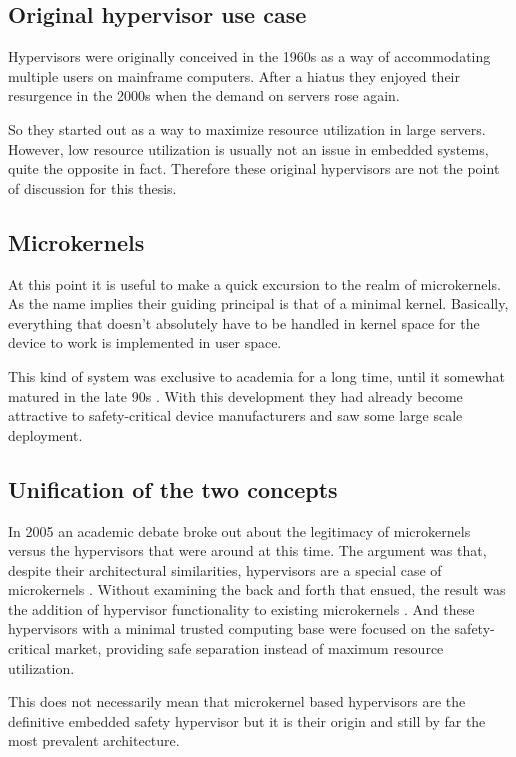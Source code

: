 \subsection{Original hypervisor use case}
Hypervisors were originally conceived in the 1960s as a way of accommodating multiple users on mainframe computers. After a hiatus they enjoyed their resurgence in the 2000s when the demand on servers rose again. 

So they started out as a way to maximize resource utilization in large servers. However, low resource utilization is usually not an issue in embedded systems, quite the opposite in fact. Therefore these original hypervisors are not the point of discussion for this thesis.
\subsection{Microkernels}
At this point it is useful to make a quick excursion to the realm of microkernels. As the name implies their guiding principal is that of a minimal kernel. Basically, everything that doesn't absolutely have to be handled in kernel space for the device to work is implemented in user space.

This kind of system was exclusive to academia for a long time, until it somewhat matured in the late 90s \cite{Liedtke.1995}\cite{Liedtke.1996}. With this development they had already become attractive to safety-critical device manufacturers and saw some large scale deployment.

\subsection{Unification of the two concepts}
In 2005 an academic debate broke out about the legitimacy of microkernels versus the hypervisors that were around at this time. 
The argument was that, despite their architectural similarities, hypervisors are a special case of microkernels  \cite{StevenHand.2005}\cite{Heiser.2006}. Without examining the back and forth that ensued, the result was the addition of hypervisor functionality to existing microkernels \cite{Heiser.2010}. And these hypervisors with a minimal trusted computing base were focused on the safety-critical market, providing safe separation instead of maximum resource utilization.

This does not necessarily mean that microkernel based hypervisors are the definitive embedded safety hypervisor but it is their origin and still by far the most prevalent architecture.


